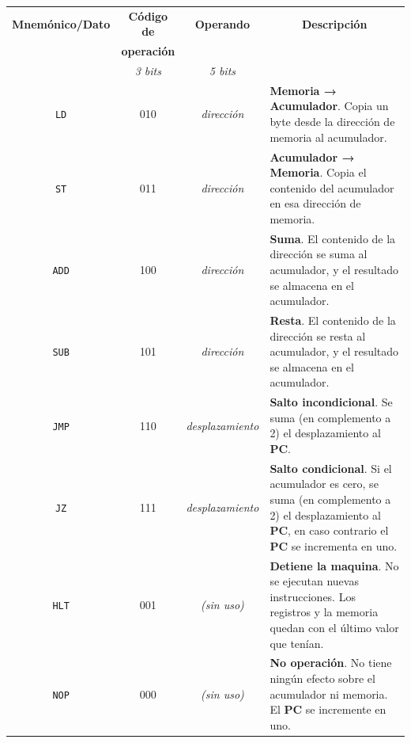 \documentclass[12pt]{article}
\begin{document}
\begin{tabularx}{\textwidth}{c|c|c|X}

    \textbf{Mnemónico/Dato} & \textbf{Código de} & \textbf{Operando} &
    \multicolumn{1}{c}{\textbf{Descripción}} \\

    & \textbf{operación} & & \\

    & \emph{3 bits} & \emph{5 bits} & \\
    \hline
    \hline

    \texttt{LD} & 010 & \emph{dirección} & \textbf{Memoria → Acumulador}. Copia
    un byte desde la dirección de memoria al acumulador. \\ \hline

    \texttt{ST} & 011 & \emph{dirección} & \textbf{Acumulador → Memoria}. Copia
    el contenido del acumulador en esa dirección de memoria. \\ \hline

    \texttt{ADD} & 100 & \emph{dirección} & \textbf{Suma}. El contenido de la
    dirección se suma al acumulador, y el resultado se almacena en el
    acumulador. \\ \hline

    \texttt{SUB} & 101 & \emph{dirección} & \textbf{Resta}. El contenido de la
    dirección se resta al acumulador, y el resultado se almacena en el
    acumulador. \\ \hline

    \texttt{JMP} & 110 & \emph{desplazamiento} & \textbf{Salto incondicional}. Se
    suma (en complemento a 2) el desplazamiento al \textbf{PC}. \\ \hline

    \texttt{JZ} & 111 & \emph{desplazamiento} & \textbf{Salto condicional}. Si
    el acumulador es cero, se suma (en complemento a 2) el desplazamiento al
    \textbf{PC}, en caso contrario el \textbf{PC} se incrementa en uno. \\
    \hline

    \texttt{HLT} & 001 & \emph{(sin uso)} & \textbf{Detiene la maquina}. No se
    ejecutan nuevas instrucciones. Los registros y la memoria quedan con el
    último valor que tenían. \\ \hline

    \texttt{NOP} & 000 & \emph{(sin uso)} & \textbf{No operación}. No tiene
    ningún efecto sobre el acumulador ni memoria. El \textbf{PC} se incremente
    en uno. \\

\end{tabularx}
\end{document}
